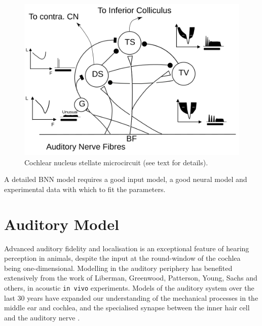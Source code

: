 \begin{figure}[ht!]
  \centering
  \includegraphics[width=\textwidth]{gfx/CNcircuit}
  \caption{Cochlear nucleus stellate microcircuit (see text for details). }
  \label{fig:microcircuit}
\end{figure}


A detailed BNN model requires a good input model, a good neural model and experimental
data with which to fit the parameters.  

\section{Auditory Model}

Advanced auditory fidelity and localisation is an exceptional feature
of hearing perception in animals, despite the input at the
round-window of the cochlea being one-dimensional.  Modelling in the
auditory periphery has benefited extensively from the work of
Liberman, Greenwood, Patterson, Young, Sachs and others, in acoustic
\texttt{in vivo} experiments. Models of the auditory
system over the last 30 years have expanded our understanding of the
mechanical processes in the middle ear and cochlea, and the specialised
synapse between the inner hair cell and the auditory nerve
\citep{DavisVoigt:1991,Carney:1993,MeddisHewittEtAl:1990}.




